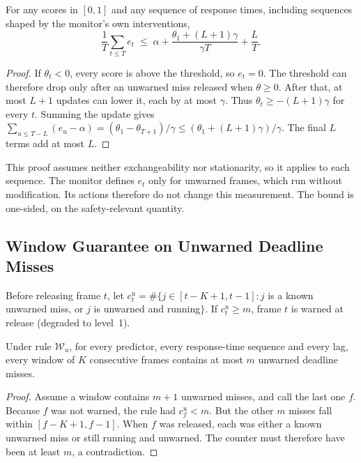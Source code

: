 \documentclass[acmsmall,screen]{acmart}
\newcommand{\Wu}{$\mathcal{W}_u$}
\begin{document}
\begin{theorem}\label{thm:aci}
For any scores in $[0,1]$ and any sequence of response times, including sequences shaped by the monitor's own interventions,
\[\frac1T\sum_{t\le T}e_t\;\le\;\alpha+\frac{\theta_1+(L+1)\gamma}{\gamma T}+\frac LT.\]
\end{theorem}
\begin{proof}
If $\theta_t<0$, every score is above the threshold, so $e_t=0$. The threshold can therefore drop only after an unwarned miss released when $\theta\ge0$. After that, at most $L+1$ updates can lower it, each by at most $\gamma$. Thus $\theta_t\ge-(L+1)\gamma$ for every $t$. Summing the update gives $\sum_{u\le T-L}(e_u-\alpha)=(\theta_1-\theta_{T+1})/\gamma\le(\theta_1+(L+1)\gamma)/\gamma$. The final $L$ terms add at most $L$.
\end{proof}
This proof assumes neither exchangeability nor stationarity, so it applies to each sequence. The monitor defines $e_t$ only for unwarned frames, which run without modification. Its actions therefore do not change this measurement. The bound is one-sided, on the safety-relevant quantity.

\subsection{Window Guarantee on Unwarned Deadline Misses}\label{sec:wu}

\begin{definition}[Rule \Wu]
Before releasing frame $t$, let $c^u_t=\#\{j\in[t-K+1,t-1]: j$ is a known unwarned miss, or $j$ is unwarned and running$\}$. If
$c^u_t\ge m$, frame $t$ is warned at release (degraded to level~1).
\end{definition}

\begin{theorem}\label{thm:wu}
Under rule \Wu, for every predictor, every response-time sequence and every lag, every window of $K$ consecutive frames contains at most
$m$ unwarned deadline misses.
\end{theorem}
\begin{proof}
Assume a window contains $m+1$ unwarned misses, and call the last one $f$. Because $f$ was not warned, the rule had $c^u_f<m$. But the other $m$ misses fall within $[f-K+1,f-1]$. When $f$ was released, each was either a known unwarned miss or still running and unwarned. The counter must therefore have been at least $m$, a contradiction.
\end{proof}
\end{document}
